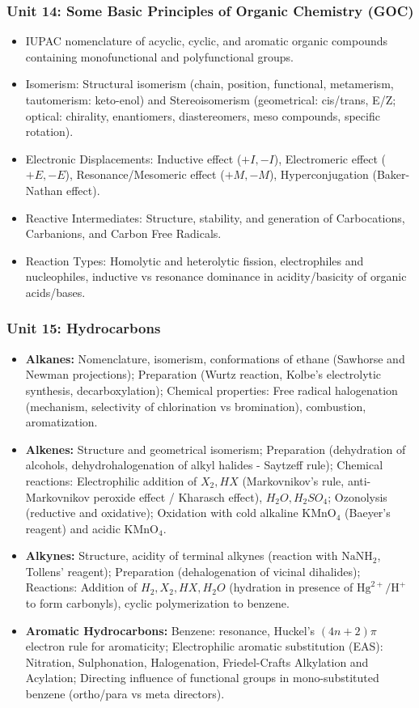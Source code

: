\documentclass[11pt,a4paper]{article}
\begin{document}
\subsubsection{Unit 14: Some Basic Principles of Organic Chemistry (GOC)}
\begin{itemize}
  \item IUPAC nomenclature of acyclic, cyclic, and aromatic organic compounds containing monofunctional and polyfunctional groups.
  \item Isomerism: Structural isomerism (chain, position, functional, metamerism, tautomerism: keto-enol) and Stereoisomerism (geometrical: cis/trans, E/Z; optical: chirality, enantiomers, diastereomers, meso compounds, specific rotation).
  \item Electronic Displacements: Inductive effect ($+I, -I$), Electromeric effect ($+E, -E$), Resonance/Mesomeric effect ($+M, -M$), Hyperconjugation (Baker-Nathan effect).
  \item Reactive Intermediates: Structure, stability, and generation of Carbocations, Carbanions, and Carbon Free Radicals.
  \item Reaction Types: Homolytic and heterolytic fission, electrophiles and nucleophiles, inductive vs resonance dominance in acidity/basicity of organic acids/bases.
\end{itemize}

\subsubsection{Unit 15: Hydrocarbons}
\begin{itemize}
  \item \textbf{Alkanes:} Nomenclature, isomerism, conformations of ethane (Sawhorse and Newman projections); Preparation (Wurtz reaction, Kolbe's electrolytic synthesis, decarboxylation); Chemical properties: Free radical halogenation (mechanism, selectivity of chlorination vs bromination), combustion, aromatization.
  \item \textbf{Alkenes:} Structure and geometrical isomerism; Preparation (dehydration of alcohols, dehydrohalogenation of alkyl halides - Saytzeff rule); Chemical reactions: Electrophilic addition of $X_2, HX$ (Markovnikov's rule, anti-Markovnikov peroxide effect / Kharasch effect), $H_2O, H_2SO_4$; Ozonolysis (reductive and oxidative); Oxidation with cold alkaline $\text{KMnO}_4$ (Baeyer's reagent) and acidic $\text{KMnO}_4$.
  \item \textbf{Alkynes:} Structure, acidity of terminal alkynes (reaction with $\text{NaNH}_2$, Tollens' reagent); Preparation (dehalogenation of vicinal dihalides); Reactions: Addition of $H_2, X_2, HX, H_2O$ (hydration in presence of $\text{Hg}^{2+}/\text{H}^+$ to form carbonyls), cyclic polymerization to benzene.
  \item \textbf{Aromatic Hydrocarbons:} Benzene: resonance, Huckel's $(4n+2)\pi$ electron rule for aromaticity; Electrophilic aromatic substitution (EAS): Nitration, Sulphonation, Halogenation, Friedel-Crafts Alkylation and Acylation; Directing influence of functional groups in mono-substituted benzene (ortho/para vs meta directors).
\end{itemize}
\end{document}
